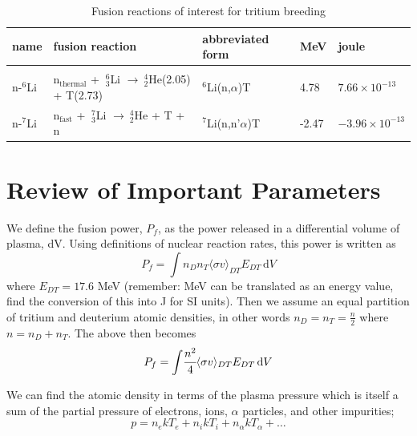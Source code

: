 \documentclass[11pt]{report} %
\begin{document}
\begin{table}
    \begin{tabular}{lllll}
     \vspace{0.5em}name       & fusion reaction                               & abbreviated form            & MeV   & joule            \\ \hline\vspace{-0.7em}\\
    \vspace{0.5em}n-$^6$Li & n$_\text{thermal}$ + $~_3^6$Li $\rightarrow~_2^4$He(2.05)  + T(2.73) & $^6$Li(n,$\alpha$)T & 4.78  &$7.66\times10^{-13}$ \\
    \vspace{0.5em}n-$^7$Li & n$_\text{fast}$ + $~_3^7$Li $\rightarrow~_2^4$He  + T + n & $^7$Li(n,n'$\alpha$)T & -2.47  &$-3.96\times10^{-13}$
    \end{tabular}\caption{Fusion reactions of interest for tritium breeding}\label{tab:reactions2}
\end{table}

\section{Review of Important Parameters}
We define the fusion power, $P_f$, as the power released in a differential volume of plasma, dV. Using definitions of nuclear reaction rates, this power is written as
\begin{equation}\label{eq:fusion-power-integral}
P_f = \int\!n_Dn_T\langle\sigma v\rangle_{DT} E_{DT}\,\mathrm{d}V
\end{equation}
where $E_{DT} = 17.6$ MeV (remember: MeV can be translated as an energy value, find the conversion of this into J for SI units). Then we assume an equal partition of tritium and deuterium atomic densities, in other words $n_D = n_T = \frac{n}{2}$ where $n = n_D + n_T$. The above then becomes
\begin{equation}\label{eq:virginFusionPower}
P_f =\int\!\cfrac{n^2}{4}\langle\sigma v\rangle_{DT} E_{DT} \,\mathrm{d}V
\end{equation}

We can find the atomic density in terms of the plasma pressure which is itself a sum of the partial pressure of electrons, ions, $\alpha$ particles, and other impurities;
\begin{equation}\label{eq:plasmapressure}
p = n_ekT_e + n_ikT_i + n_\alpha kT_\alpha + \dots
\end{equation}
\end{document}

